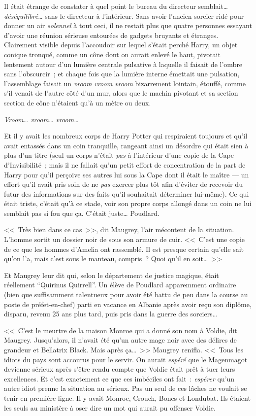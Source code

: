 Il était étrange de constater à quel point le bureau du directeur semblait… \emph{déséquilibré}… sans le directeur à l'intérieur. Sans avoir l'ancien sorcier ridé pour donner un air \emph{solennel} à tout ceci, il ne restait plus que quatre personnes essayant d'avoir une réunion sérieuse entourées de gadgets bruyants et étranges. Clairement visible depuis l'accoudoir sur lequel s'était perché Harry, un objet conique tronqué, comme un cône dont on aurait enlevé le haut, pivotait lentement autour d'un lumière centrale pulsative à laquelle il faisait de l'ombre sans l'obscurcir~; et chaque fois que la lumière interne émettait une pulsation, l'assemblage faisait un \emph{vroom vroom vroom} bizarrement lointain, étouffé, comme s'il venait de l'autre côté d'un mur, alors que le machin pivotant et sa section section de cône n'étaient qu'à un mètre ou deux.

\emph{Vroom… vroom… vroom…}

Et il y avait les nombreux corps de Harry Potter qui respiraient toujours et qu'il avait entassés dans un coin tranquille, rangeant ainsi un désordre qui était sien à plus d'un titre (seul un corps n'était \emph{pas} à l'intérieur d'une copie de la Cape d'Invisibilité~; mais il ne fallait qu'un petit effort de concentration de la part de Harry pour qu'il perçoive ses autres lui sous la Cape dont il était le maître — un effort qu'il avait pris soin de ne \emph{pas} exercer plus tôt afin d'éviter de recevoir du futur des informations sur des faits qu'il souhaitait déterminer lui-même). Ce qui était triste, c'était qu'à ce stade, voir son propre corps allongé dans un coin ne lui semblait pas si fou que ça. C'était juste… Poudlard.

<<~Très bien dans ce cas~>>, dit Maugrey, l'air mécontent de la situation. L'homme sortit un dossier noir de sous son armure de cuir. <<~C'est une copie de ce que les hommes d'Amelia ont rassemblé. Il est presque certain qu'elle sait qu'on l'a, mais c'est sous le manteau, compris~? Quoi qu'il en soit…~>>

Et Maugrey leur dit qui, selon le département de justice magique, était réellement “Quirinus Quirrell”. Un élève de Poudlard apparemment ordinaire (bien que suffisamment talentueux pour avoir été battu de peu dans la course au poste de préfet-en-chef) parti en vacance en Albanie après avoir reçu son diplôme, disparu, revenu 25 ans plus tard, puis pris dans la guerre des sorciers…

<<~C'est le meurtre de la maison Monroe qui a donné son nom à Voldie, dit Maugrey. Jusqu'alors, il n'avait été qu'un autre mage noir avec des délires de grandeur et Bellatrix Black. Mais après ça…~>> Maugrey renifla. <<~Tous les idiots du pays sont accourus pour le servir. On aurait \emph{espéré} que le Magenmagot devienne sérieux après s'être rendu compte que Voldie était prêt à tuer leurs excellences. Et c'est exactement ce que ces imbéciles ont fait~: \emph{espérer} qu'un autre idiot prenne la situation au sérieux. Pas un seul de ces lâches ne voulait se tenir en première ligne. Il y avait Monroe, Crouch, Bones et Londubat. Ils étaient les seuls au ministère à oser dire un mot qui aurait pu offenser Voldie.

